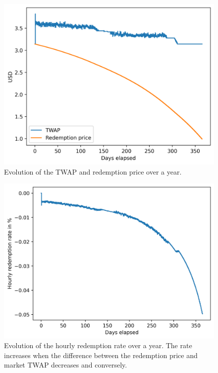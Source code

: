 \documentclass{article}
\begin{document}
    \begin{figure}
      \begin{center}
        \includegraphics[scale=0.7]{figures/price-evol 2021-03-10 14-34-53.png}
      \end{center}
      \caption{Evolution of the TWAP and redemption price over a year.}
    \end{figure}

    \begin{figure}
      \begin{center}
        \includegraphics[scale=0.7]{figures/redemption-rate-evol 2021-03-10 14-34-53.png}
      \end{center}
      \caption{Evolution of the hourly redemption rate over a year. The rate increases when the difference between the redemption price and market TWAP decreases and conversely.}
    \end{figure}
\end{document}
